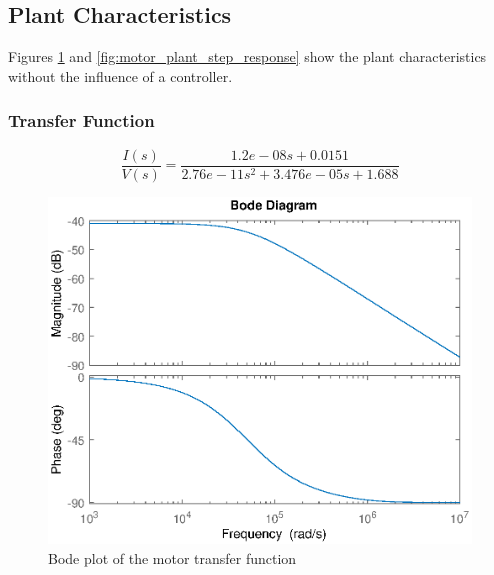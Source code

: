 \documentclass{report}
\begin{document}
\subsection{Plant Characteristics}
Figures \ref{fig:motor_plant_bode} and \ref{fig:motor_plant_step_response} show the plant characteristics without the influence of a controller.
\subsubsection{Transfer Function}
\begin{equation}
\frac{I(s)}{V(s)} = \frac{1.2e-08 s + 0.0151}{2.76e-11 s^2 + 3.476e-05 s + 1.688}
\end{equation}

\begin{figure}[h]
\centering
\includegraphics[scale=0.6]{motor_plant_bode}	
\caption{Bode plot of the motor transfer function}
\label{fig:motor_plant_bode}
\end{figure}
\end{document}
